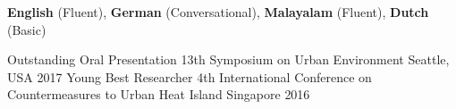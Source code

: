 \documentclass[11pt, a4paper]{awesome-cv}
\begin{document}

\begin{cvskills}
    \cvskill
    {}
    {\textbf{English} (Fluent), \textbf{German} (Conversational), \textbf{Malayalam} (Fluent), \textbf{Dutch} (Basic)}
\end{cvskills}



\begin{cvhonors}

  \cvhonor
    {Outstanding Oral Presentation} %
    {13th Symposium on Urban Environment} %
    {Seattle, USA} %
    {2017} %
  \cvhonor
    {Young Best Researcher} %
    {4th International Conference on Countermeasures to Urban Heat Island} %
    {Singapore} %
    {2016} %
\end{cvhonors}


\end{document}
